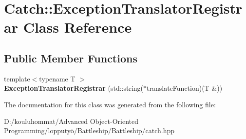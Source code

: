 \hypertarget{class_catch_1_1_exception_translator_registrar}{}\section{Catch\+:\+:Exception\+Translator\+Registrar Class Reference}
\label{class_catch_1_1_exception_translator_registrar}
\subsection*{Public Member Functions}
\begin{DoxyCompactItemize}
\item 
\mbox{\label{class_catch_1_1_exception_translator_registrar_aa73229de911f26b1df6c6c87c4d9e04e}} 
{\footnotesize template$<$typename T $>$ }\\{\bfseries Exception\+Translator\+Registrar} (std\+::string($\ast$translate\+Function)(T \&))
\end{DoxyCompactItemize}


The documentation for this class was generated from the following file\+:\begin{DoxyCompactItemize}
\item 
D\+:/kouluhommat/\+Advanced Object-\/\+Oriented Programming/lopputyö/\+Battleship/\+Battleship/catch.\+hpp\end{DoxyCompactItemize}
